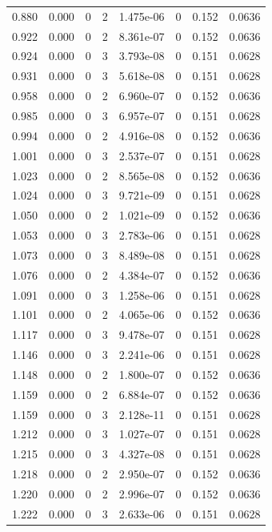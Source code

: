 \documentclass[preview]{standalone}
\begin{document}
{{{\begin{tabular}{L{1.2cm}C{1.2cm} C{0.3cm}C{0.5cm} C{1.4cm}C{1.4cm} C{1.4cm}C{1.4cm}}
  0.880  &  0.000  & 0     &  2 &  1.475e-06  & 0  & 0.152 &  0.0636   \\ 
  0.922  &  0.000  & 0     &  2 &  8.361e-07  & 0  & 0.152 &  0.0636   \\ 
  0.924  &  0.000  & 0     &  3 &  3.793e-08  & 0  & 0.151 &  0.0628   \\ 
  0.931  &  0.000  & 0     &  3 &  5.618e-08  & 0  & 0.151 &  0.0628   \\ 
  0.958  &  0.000  & 0     &  2 &  6.960e-07  & 0  & 0.152 &  0.0636   \\ 
  0.985  &  0.000  & 0     &  3 &  6.957e-07  & 0  & 0.151 &  0.0628   \\ 
  0.994  &  0.000  & 0     &  2 &  4.916e-08  & 0  & 0.152 &  0.0636   \\ 
  1.001  &  0.000  & 0     &  3 &  2.537e-07  & 0  & 0.151 &  0.0628   \\ 
  1.023  &  0.000  & 0     &  2 &  8.565e-08  & 0  & 0.152 &  0.0636   \\ 
  1.024  &  0.000  & 0     &  3 &  9.721e-09  & 0  & 0.151 &  0.0628   \\ 
  1.050  &  0.000  & 0     &  2 &  1.021e-09  & 0  & 0.152 &  0.0636   \\ 
  1.053  &  0.000  & 0     &  3 &  2.783e-06  & 0  & 0.151 &  0.0628   \\ 
  1.073  &  0.000  & 0     &  3 &  8.489e-08  & 0  & 0.151 &  0.0628   \\ 
  1.076  &  0.000  & 0     &  2 &  4.384e-07  & 0  & 0.152 &  0.0636   \\ 
  1.091  &  0.000  & 0     &  3 &  1.258e-06  & 0  & 0.151 &  0.0628   \\ 
  1.101  &  0.000  & 0     &  2 &  4.065e-06  & 0  & 0.152 &  0.0636   \\ 
  1.117  &  0.000  & 0     &  3 &  9.478e-07  & 0  & 0.151 &  0.0628   \\ 
  1.146  &  0.000  & 0     &  3 &  2.241e-06  & 0  & 0.151 &  0.0628   \\ 
  1.148  &  0.000  & 0     &  2 &  1.800e-07  & 0  & 0.152 &  0.0636   \\ 
  1.159  &  0.000  & 0     &  2 &  6.884e-07  & 0  & 0.152 &  0.0636   \\ 
  1.159  &  0.000  & 0     &  3 &  2.128e-11  & 0  & 0.151 &  0.0628   \\ 
  1.212  &  0.000  & 0     &  3 &  1.027e-07  & 0  & 0.151 &  0.0628   \\ 
  1.215  &  0.000  & 0     &  3 &  4.327e-08  & 0  & 0.151 &  0.0628   \\ 
  1.218  &  0.000  & 0     &  2 &  2.950e-07  & 0  & 0.152 &  0.0636   \\ 
  1.220  &  0.000  & 0     &  2 &  2.996e-07  & 0  & 0.152 &  0.0636   \\ 
  1.222  &  0.000  & 0     &  3 &  2.633e-06  & 0  & 0.151 &  0.0628   \\ 
\hline 
\end{tabular} 

}}}
\end{document}
